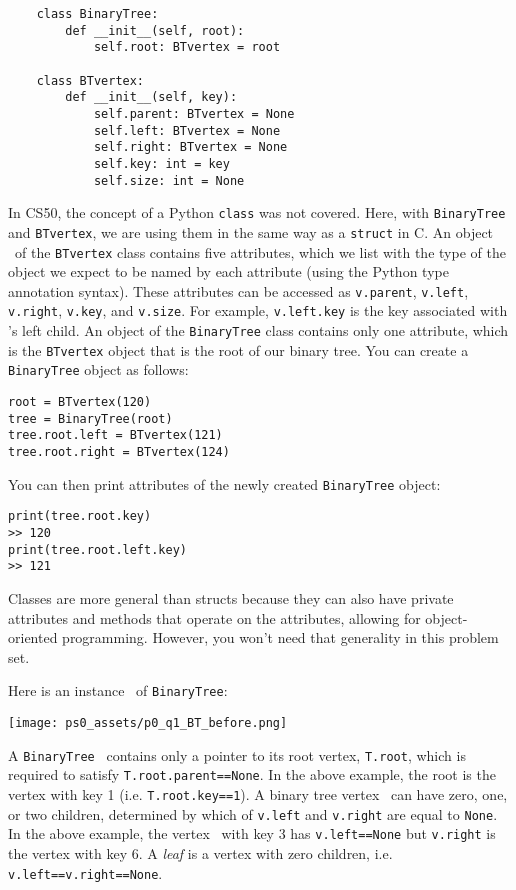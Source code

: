 \documentclass[11pt]{article}
\begin{document}
\begin{enumerate}
 \begin{verbatim}
    class BinaryTree:
        def __init__(self, root):
            self.root: BTvertex = root
 
    class BTvertex:
        def __init__(self, key):
            self.parent: BTvertex = None
            self.left: BTvertex = None
            self.right: BTvertex = None
            self.key: int = key
            self.size: int = None
 \end{verbatim}


 In CS50, the concept of a Python \texttt{class} was not covered. Here, with \texttt{BinaryTree} and \texttt{BTvertex}, we are using them in the same way as a \texttt{struct} in C. An object \btv\ of the \texttt{BTvertex} class contains five attributes, which we list with the type of the object we expect to be named by each attribute (using the Python type annotation syntax). These attributes can be accessed as \texttt{v.parent}, \texttt{v.left}, \texttt{v.right}, \texttt{v.key}, and \texttt{v.size}. 
 For example, \texttt{v.left.key} is the key associated with \btv's left child. An object of the \texttt{BinaryTree} class contains only one attribute, which is the \texttt{BTvertex} object that is the root of our binary tree. You can create a \texttt{BinaryTree} object as follows:
 
\begin{verbatim}
root = BTvertex(120)
tree = BinaryTree(root)
tree.root.left = BTvertex(121)
tree.root.right = BTvertex(124)
\end{verbatim}

You can then print attributes of the newly created \texttt{BinaryTree} object:
\begin{verbatim}
print(tree.root.key)
>> 120
print(tree.root.left.key)
>> 121
\end{verbatim}
 

 Classes are more general than structs because they can also have private attributes and methods that operate on the attributes, allowing for object-oriented programming. However, you won't need that generality in this problem set.

 Here is an instance \treeT\ of \texttt{BinaryTree}:
 
 \texttt{[image: ps0\_assets/p0\_q1\_BT\_before.png]}

 A \texttt{BinaryTree} \treeT\  contains only a pointer to its root vertex, \texttt{T.root}, which is required to satisfy \texttt{T.root.parent==None}. In the above example, 
 the root is the vertex with key 1 (i.e. \texttt{T.root.key==1}).
 A binary tree vertex \btv\ can have zero, one, or two children, determined by which of \texttt{v.left} and  \texttt{v.right} are equal to \texttt{None}.    In the above example, the vertex \btv\ with key 3 has 
 \texttt{v.left==None} but \texttt{v.right} is the vertex with key 6.
 A {\em leaf} is a vertex with zero children, i.e. \texttt{v.left==v.right==None}. 
 

\end{enumerate}
\end{document}

